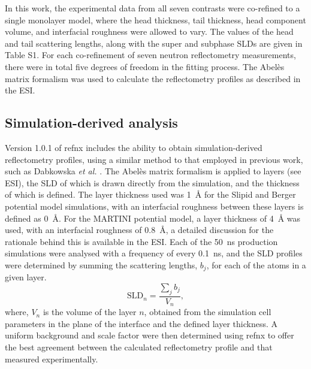 \documentclass[amsmath,amssymb,twocolumn,superscriptaddress]{revtex4-1}
\begin{document}
In this work, the experimental data from all seven contrasts were co-refined
to a single monolayer model, where the head thickness, tail thickness, head
component volume, and interfacial roughness were allowed to vary.
The values of the head and tail scattering lengths, along with the super and
subphase SLDs are given in Table S1.
For each co-refinement of seven neutron reflectometry measurements, there
were in total five degrees of freedom in the fitting process.
The Abel\`{e}s matrix formalism was used to calculate the reflectometry
profiles as described in the ESI.

\subsection{Simulation-derived analysis}
Version 1.0.1 of refnx \cite{nelson_refnx_2019,nelson_refnx_2018} includes
the ability to obtain simulation-derived reflectometry profiles, using a
similar method to that employed in previous work, such as
Dabkowska \emph{et al.} \cite{dabkowska_modulation_2014}.
The Abel\`{e}s matrix formalism is applied to layers (see ESI), the SLD of
which is drawn directly from the simulation, and the thickness of which is
defined.
The layer thickness used was \SI{1}{\angstrom} for the Slipid and Berger
potential model simulations, with an interfacial roughness between these
layers is defined as \SI{0}{\angstrom}.
For the MARTINI potential model, a layer thickness of \SI{4}{\angstrom} was
used, with an interfacial roughness of \SI{0.8}{\angstrom}, a detailed
discussion for the rationale behind this is available in the ESI.
Each of the \SI{50}{\nano\second} production simulations were analysed with
a frequency of every \SI{0.1}{\nano\second}, and the SLD profiles were
determined by summing the scattering lengths, $b_j$, for each of the atoms
in a given layer.
%
\begin{equation}
  \text{SLD}_n = \frac{\sum_j{b_j}}{V_n},
\end{equation}
%
where, $V_n$ is the volume of the layer $n$, obtained from the simulation
cell parameters in the plane of the interface and the defined layer thickness.
A uniform background and scale factor were then determined using refnx to
offer the best agreement between the calculated reflectometry profile and
that measured experimentally.
\end{document}
